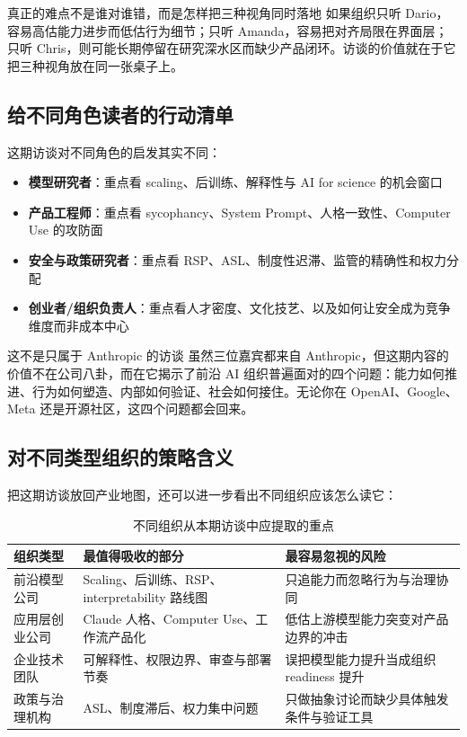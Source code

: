 \documentclass[a4paper]{article}
\begin{document}
\begin{knowledgebox}{真正的难点不是谁对谁错，而是怎样把三种视角同时落地}
如果组织只听 Dario，容易高估能力进步而低估行为细节；只听 Amanda，容易把对齐局限在界面层；只听 Chris，则可能长期停留在研究深水区而缺少产品闭环。访谈的价值就在于它把三种视角放在同一张桌子上。
\end{knowledgebox}

\subsection{给不同角色读者的行动清单}

这期访谈对不同角色的启发其实不同：

\begin{itemize}
    \item \textbf{模型研究者}：重点看 scaling、后训练、解释性与 AI for science 的机会窗口
    \item \textbf{产品工程师}：重点看 sycophancy、System Prompt、人格一致性、Computer Use 的攻防面
    \item \textbf{安全与政策研究者}：重点看 RSP、ASL、制度性迟滞、监管的精确性和权力分配
    \item \textbf{创业者/组织负责人}：重点看人才密度、文化技艺、以及如何让安全成为竞争维度而非成本中心
\end{itemize}

\begin{importantbox}{这不是只属于 Anthropic 的访谈}
虽然三位嘉宾都来自 Anthropic，但这期内容的价值不在公司八卦，而在它揭示了前沿 AI 组织普遍面对的四个问题：能力如何推进、行为如何塑造、内部如何验证、社会如何接住。无论你在 OpenAI、Google、Meta 还是开源社区，这四个问题都会回来。
\end{importantbox}

\subsection{对不同类型组织的策略含义}

把这期访谈放回产业地图，还可以进一步看出不同组织应该怎么读它：

\begin{table}[H]
\centering
\begin{tabular}{p{} p{} p{}}
\toprule
组织类型 & 最值得吸收的部分 & 最容易忽视的风险 \\
\midrule
前沿模型公司 & Scaling、后训练、RSP、interpretability 路线图 & 只追能力而忽略行为与治理协同 \\
应用层创业公司 & Claude 人格、Computer Use、工作流产品化 & 低估上游模型能力突变对产品边界的冲击 \\
企业技术团队 & 可解释性、权限边界、审查与部署节奏 & 误把模型能力提升当成组织 readiness 提升 \\
政策与治理机构 & ASL、制度滞后、权力集中问题 & 只做抽象讨论而缺少具体触发条件与验证工具 \\
\bottomrule
\end{tabular}
\caption{不同组织从本期访谈中应提取的重点}
\end{table}
\end{document}
